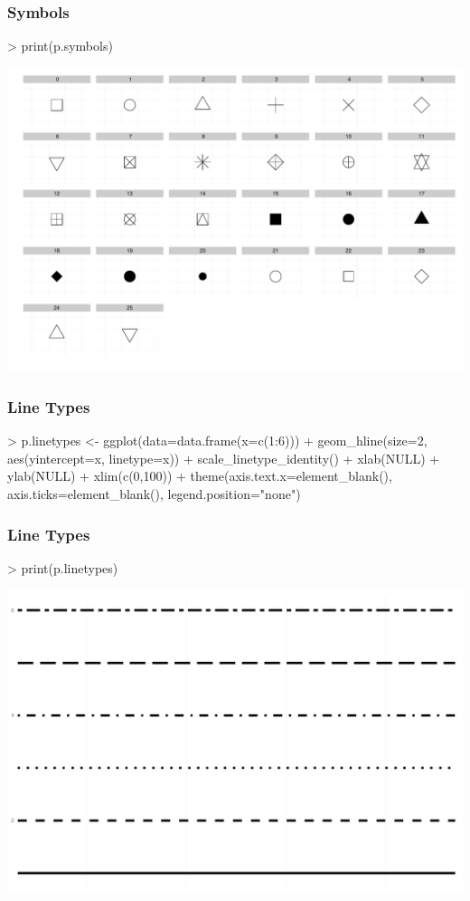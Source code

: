 \documentclass[10pt,slidestop,mathserif,c]{beamer}
\begin{document}
\begin{frame}
	\frametitle{Symbols}
\begin{Schunk}
\begin{Sinput}
> print(p.symbols)
\end{Sinput}
\end{Schunk}
\includegraphics{Slides-symbols}
\end{frame}


\begin{frame}
    \frametitle{Line Types}
\begin{Schunk}
\begin{Sinput}
> p.linetypes <- ggplot(data=data.frame(x=c(1:6))) + 
       geom_hline(size=2, aes(yintercept=x, linetype=x)) +
   	scale_linetype_identity() +
   	xlab(NULL) + ylab(NULL) + xlim(c(0,100)) +
   	theme(axis.text.x=element_blank(), axis.ticks=element_blank(), legend.position="none")
\end{Sinput}
\end{Schunk}
\end{frame}

\begin{frame}
	\frametitle{Line Types}
\begin{Schunk}
\begin{Sinput}
> print(p.linetypes)
\end{Sinput}
\end{Schunk}
\includegraphics{Slides-linetypes}
\end{frame}
\end{document}
